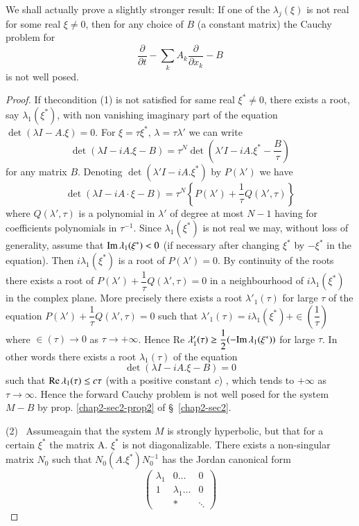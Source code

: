 We shall actually prove a slightly stronger result: If one of the
$\lambda_j (\xi )$ is not real for some real $\xi \neq 0$, then for
any choice of $B$ (a constant matrix) the Cauchy problem for  
$$
 \frac{\partial}{\partial t} - \sum\limits_{k} A_k
 \frac{\partial}{\partial x_k}- B  
 $$
 is not well posed. 

\begin{proof}
If the\pageoriginale condition (1) is not satisfied for same real
$\xi^* \neq 0$, there exists a root, say $\lambda_1 (\xi^*)$, with
non vanishing imaginary part of the equation $\det(\lambda I - A. \xi
) = 0$. For 
$\xi = \tau \xi^*$,  $\lambda = \tau \lambda'$ we can write    
$$
\det(\lambda I - iA. \xi - B) = \tau^N \det \left(\lambda'I - iA. \xi^* -
\frac{B}{\tau}\right)  
$$
for any matrix $B$. Denoting $\det (\lambda' I - i A. \xi^*)$ by
$P(\lambda')$ we have  
 \begin{equation}
\det (\lambda I  - iA \cdot \xi - B ) = \tau^N \left\{ P(\lambda' ) +
\frac{1}{\tau } Q (\lambda', \tau )\right\}  \tag{5.4}\label{chap2-eq5.4} 
 \end{equation} 
 where $Q (\lambda', \tau )$ is a polynomial in $\lambda'$ of degree
 at most $N-1$ having for coefficients polynomials in
 $\tau^{-1}$. Since $\lambda_1(\xi^*)$ is not real we may, without
 loss of generality, assume that $\text{Im\,} \lambda_1 (\xi^*) < 0$ (if
 necessary after changing $\xi^*$ by $-\xi^*$ in the equation).
 Then $ i\lambda_1 (\xi^*)$ is a root of $P(\lambda') =0 $. By
 continuity of the roots there exists a root of $P(\lambda' ) +
 \dfrac{1}{\tau} Q (\lambda', \tau)=0 $ in a neighbourhood of $i
 \lambda_1 (\xi^*) $ in the complex plane. More precisely there exists
 a root 
 $\lambda'_1(\tau)$ for large $\tau$ of the equation $P(\lambda') +
 \dfrac{1}{\tau}Q (\lambda', \tau) = 0$ such that $\lambda'_1(\tau) =
 i \lambda_1 (\xi^* ) + \in (\dfrac{1}{\tau})$ where $\in (\tau
 )\rightarrow 0$ as $\tau \rightarrow +  \infty$. Hence Re $\lambda'_1
 (\tau )\geq \dfrac{1}{2} (-\text{Im\,} \lambda_1 (\xi^\ast))$ for large
 $\tau$. In other words there exists a root $\lambda_1 (\tau)$ of the
 equation
$$
\det(\lambda I - iA. \xi - B ) = 0 
$$ 
such that $\operatorname{Re} \lambda_1 (\tau) \leq c \tau $ (with a positive constant
$c$) ,  which tends to $+ \infty$ as $\tau \rightarrow \infty$. Hence
the forward Cauchy problem is not well posed for the system $M - B $
by prop. \ref{chap2-sec2-prop2} of \S\ \ref{chap2-sec2}.   

 (2)~ Assume\pageoriginale again that the system $M$ is strongly
 hyperbolic,  but  
 that for a certain $\xi^\ast$ the matrix A. $\xi^*$ is not
 diagonalizable. There exists a non-singular matrix $N_0$ such that 
 $N_0 (A. \xi^*)N_0^{-1}$ has the Jordan canonical form  
\begin{equation*}
\begin{pmatrix} 
\lambda_1 &  0 \ldots &  0 \\
1 & \lambda_1 \ldots & 0 \\
 & *   & \ddots 
 \end{pmatrix}  \tag{5.5}\label{chap2-eq5.5}
\end{equation*}
 

\end{proof}
